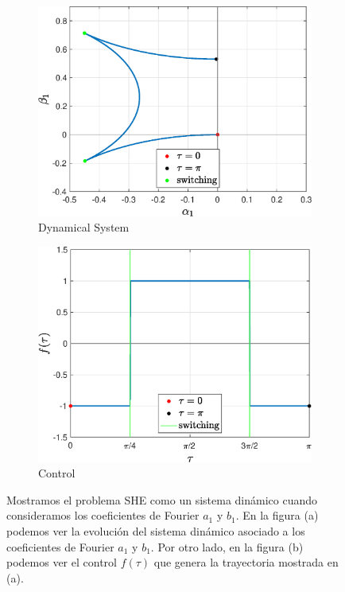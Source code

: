 \begin{figure}
    \centering
    \begin{subfigure}[b]{0.475\textwidth}
        \centering
        \includegraphics[width=\textwidth]{img/sys.eps}
        \caption{Dynamical System}
        \label{fig:sys}
    \end{subfigure}
    \hfill
    \begin{subfigure}[b]{0.475\textwidth}
        \centering
        \includegraphics[width=\textwidth]{img/con.eps}
        \caption{Control}
        \label{fig:con}
    \end{subfigure}
    \caption{Mostramos el problema SHE como un sistema dinámico cuando consideramos los coeficientes de Fourier $a_1$ y $b_1$. En la figura (a) podemos ver la evolución del sistema dinámico asociado a los coeficientes de Fourier $a_1$ y $b_1$. Por otro lado, en la figura (b) podemos ver el control $f(\tau)$ que genera la trayectoria mostrada en (a).}
    \label{syscon}
\end{figure}